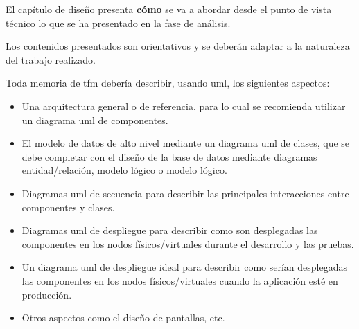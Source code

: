 
El capítulo de diseño presenta \textbf{cómo} se va a abordar desde el punto de vista técnico
lo que se ha presentado en la fase de análisis.

Los contenidos  presentados son orientativos y se deberán adaptar a la
naturaleza del trabajo realizado.

Toda memoria de \gls{tfm} debería describir, usando \gls{uml}, los siguientes aspectos:

\begin{itemize}
    \item Una arquitectura general o de referencia, para lo cual se recomienda utilizar un diagrama \gls{uml} de componentes.
    \item El modelo de datos de alto nivel mediante un diagrama \gls{uml} de clases, que se debe completar con el diseño de la base de datos mediante diagramas entidad/relación, modelo lógico o modelo lógico.
    \item Diagramas \gls{uml} de secuencia para describir las principales interacciones entre componentes y clases.
    \item Diagramas \gls{uml} de despliegue para describir como son desplegadas las componentes en los nodos físicos/virtuales durante el desarrollo y las pruebas.
    \item  Un diagrama \gls{uml} de despliegue ideal para describir como serían desplegadas las componentes en los nodos físicos/virtuales cuando la aplicación esté en producción.
    \item Otros aspectos como el diseño de pantallas, etc.
\end{itemize}